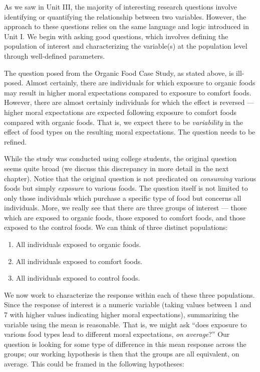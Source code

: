 \documentclass[
  letterpaper,
  DIV=11,
  numbers=noendperiod]{scrreprt}
\providecommand{\tightlist}{%
  \setlength{\itemsep}{0pt}\setlength{\parskip}{0pt}}\usepackage{longtable,booktabs,array}
\theoremstyle{plain}
\theoremstyle{definition}
\theoremstyle{definition}
\theoremstyle{remark}
\begin{document}
As we saw in Unit III, the majority of interesting research questions
involve identifying or quantifying the relationship between two
variables. However, the approach to these questions relies on the same
language and logic introduced in Unit I. We begin with asking good
questions, which involves defining the population of interest and
characterizing the variable(s) at the population level through
well-defined parameters.

The question posed from the Organic Food Case Study, as stated above, is
ill-posed. Almost certainly, there are individuals for which exposure to
organic foods may result in higher moral expectations compared to
exposure to comfort foods. However, there are almost certainly
individuals for which the effect is reversed --- higher moral
expectations are expected following exposure to comfort foods compared
with organic foods. That is, we expect there to be \emph{variability} in
the effect of food types on the resulting moral expectations. The
question needs to be refined.

While the study was conducted using college students, the original
question seems quite broad (we discuss this discrepancy in more detail
in the next chapter). Notice that the original question is not
predicated on \emph{consuming} various foods but simply \emph{exposure}
to various foods. The question itself is not limited to only those
individuals which purchase a specific type of food but concerns all
individuals. More, we really see that there are three groups of interest
--- those which are exposed to organic foods, those exposed to comfort
foods, and those exposed to the control foods. We can think of three
distinct populations:

\begin{enumerate}
\def\labelenumi{\arabic{enumi}.}
\tightlist
\item
  All individuals exposed to organic foods.
\item
  All individuals exposed to comfort foods.
\item
  All individuals exposed to control foods.
\end{enumerate}

We now work to characterize the response within each of these three
populations. Since the response of interest is a numeric variable
(taking values between 1 and 7 with higher values indicating higher
moral expectations), summarizing the variable using the mean is
reasonable. That is, we might ask ``does exposure to various food types
lead to different moral expectations, \emph{on average}?'' Our question
is looking for some type of difference in this mean response across the
groups; our working hypothesis is then that the groups are all
equivalent, on average. This could be framed in the following
hypotheses:
\end{document}
